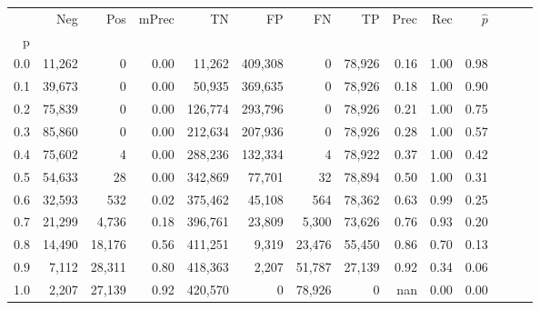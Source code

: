 \begin{tabular}{rrrrrrrrrrrrrr}
\toprule
{} &     Neg &     Pos & mPrec &       TN &       FP &      FN &      TP &  Prec &   Rec & $\hat{p}$ \\
p   &         &         &       &          &          &         &         &       &       &           \\
\midrule
0.0 &  11,262 &       0 &  0.00 &   11,262 &  409,308 &       0 &  78,926 &  0.16 &  1.00 &      0.98 \\
0.1 &  39,673 &       0 &  0.00 &   50,935 &  369,635 &       0 &  78,926 &  0.18 &  1.00 &      0.90 \\
0.2 &  75,839 &       0 &  0.00 &  126,774 &  293,796 &       0 &  78,926 &  0.21 &  1.00 &      0.75 \\
0.3 &  85,860 &       0 &  0.00 &  212,634 &  207,936 &       0 &  78,926 &  0.28 &  1.00 &      0.57 \\
0.4 &  75,602 &       4 &  0.00 &  288,236 &  132,334 &       4 &  78,922 &  0.37 &  1.00 &      0.42 \\
0.5 &  54,633 &      28 &  0.00 &  342,869 &   77,701 &      32 &  78,894 &  0.50 &  1.00 &      0.31 \\
0.6 &  32,593 &     532 &  0.02 &  375,462 &   45,108 &     564 &  78,362 &  0.63 &  0.99 &      0.25 \\
0.7 &  21,299 &   4,736 &  0.18 &  396,761 &   23,809 &   5,300 &  73,626 &  0.76 &  0.93 &      0.20 \\
0.8 &  14,490 &  18,176 &  0.56 &  411,251 &    9,319 &  23,476 &  55,450 &  0.86 &  0.70 &      0.13 \\
0.9 &   7,112 &  28,311 &  0.80 &  418,363 &    2,207 &  51,787 &  27,139 &  0.92 &  0.34 &      0.06 \\
1.0 &   2,207 &  27,139 &  0.92 &  420,570 &        0 &  78,926 &       0 &   nan &  0.00 &      0.00 \\
\bottomrule
\end{tabular}
